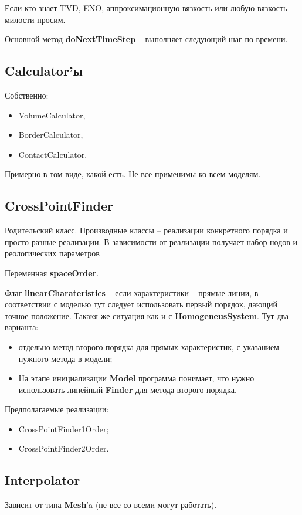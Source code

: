\documentclass[a4paper,12pt]{article}
\numberwithin{equation}{section}
\begin{document}
	Если кто знает TVD, ENO, аппроксимационную вязкость или любую вязкость -- милости просим.
	
	Основной метод \textbf{doNextTimeStep} -- выполняет следующий шаг по времени.

\subsection{Calculator'ы}
	Собственно:
	\begin{itemize}
		\item{VolumeCalculator,}
		\item{BorderCalculator,}
		\item{ContactCalculator.}
	\end{itemize}
	Примерно в том виде, какой есть. Не все применимы ко всем моделям.

\subsection{CrossPointFinder}
	Родительский класс. Производные классы -- реализации конкретного порядка и просто разные реализации.
	В зависимости от реализации получает набор нодов и реологических параметров
	
	Переменная \textbf{spaceOrder}.
	
	Флаг \textbf{linearCharateristics} -- если характеристики -- прямые линии, в соответствии с моделью тут следует использовать первый порядок, дающий точное положение. Такакя же ситуация как и с \textbf{HomogeneusSystem}.
	Тут два варианта: 
		\begin{itemize}
			\item{отдельно метод второго порядка для прямых характеристик, с указанием нужного метода в модели;}
			\item{На этапе инициализации \textbf{Model} программа понимает, что нужно использовать линейный \textbf{Finder} для метода второго порядка.}
		\end{itemize}

	Предполагаемые реализации:
		\begin{itemize}
			\item{CrossPointFinder1Order;}
			\item{CrossPointFinder2Order.}
		\end{itemize}

\subsection{Interpolator}
	Зависит от типа \textbf{Mesh}'a (не все со всеми могут работать).
	
\end{document}
